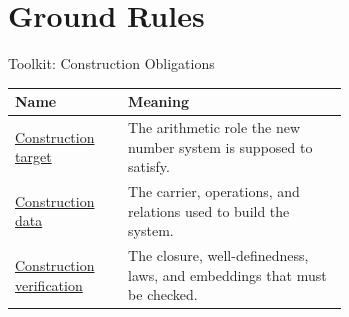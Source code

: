 \section{Ground Rules}
\begin{toolkitbox}{Toolkit: Construction Obligations}
\small
\renewcommand{\arraystretch}{1.35}
\begin{tabular}{@{} l p{0.66\linewidth} @{}}
\toprule
\textbf{Name} & \textbf{Meaning} \\
\midrule
\hyperref[def:number-system-construction-target]{Construction target}
  & The arithmetic role the new number system is supposed to satisfy. \\
\hyperref[def:number-system-construction-data]{Construction data}
  & The carrier, operations, and relations used to build the system. \\
\hyperref[def:number-system-construction-verification]{Construction verification}
  & The closure, well-definedness, laws, and embeddings that must be checked. \\
\bottomrule
\end{tabular}
\end{toolkitbox}


